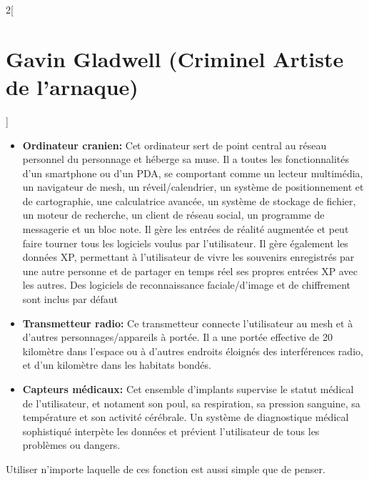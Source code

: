 \documentclass[a4paper,9pt]{article}
\begin{document}
\begin{multicols}{2}[\section*{Gavin Gladwell (Criminel Artiste de l'arnaque)}]
   \begin{itemize}
      \item \textbf{Ordinateur cranien:} Cet ordinateur sert de point central au
         réseau personnel du personnage et héberge sa muse. Il a toutes
         les fonctionnalités d'un smartphone ou d'un PDA, se comportant comme un
         lecteur multimédia, un navigateur de mesh, un réveil/calendrier, un
         système de positionnement et de cartographie, une calculatrice avancée,
         un système de stockage de fichier, un moteur de recherche, un client de
         réseau social, un programme de messagerie et un bloc note. Il gère les
         entrées de réalité augmentée et peut faire tourner tous les logiciels
         voulus par l'utilisateur. Il gère également les données XP, permettant à
         l'utilisateur de vivre les souvenirs enregistrés par une autre personne et
         de partager en temps réel ses propres entrées XP avec les autres. Des
         logiciels de reconnaissance faciale/d'image et de chiffrement
         sont inclus par défaut
      \item \textbf{Transmetteur radio:} Ce transmetteur connecte l'utilisateur au
         mesh et à d'autres personnages/appareils à portée. Il a une portée
         effective de 20 kilomètre dans l'espace ou à d'autres endroits éloignés
         des interférences radio, et d'un kilomètre dans les habitats bondés.
      \item \textbf{Capteurs médicaux:} Cet ensemble d'implants supervise le
         statut médical de l'utilisateur, et notament son poul, sa respiration, sa
         pression sanguine, sa température et son activité cérébrale. Un système de
         diagnostique médical sophistiqué interpète les données et prévient
         l'utilisateur de tous les problèmes ou dangers.
   \end{itemize} 

   Utiliser n'importe laquelle de ces fonction est aussi simple que de penser.


\end{multicols}
\end{document}
